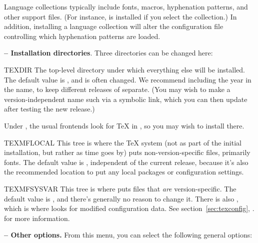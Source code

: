 \documentclass{article}
\begin{document}
\noindent Language collections typically include fonts, macros,
hyphenation patterns, and other support files.  (For instance,
 is installed if you select the 
collection.)  In addition, installing a language collection will alter
the  configuration file controlling which
hyphenation patterns are loaded.

\textbf{ -- Installation directories}.  Three directories can
be changed here:
\label{text:instdir}

\begin{ttdescription}
\item [TEXDIR] The top-level directory under which
everything else will be installed.  The default value is
, and is often changed.  We recommend
including the year in the name, to keep different releases of \TL{}
separate.  (You may wish to make a version-independent name such
 via a symbolic link, which you can then
update after testing the new release.)

Under \MacOSX, the usual frontends look for \TeX{} in
, so you may wish to install \TL{} there.

\item [TEXMFLOCAL] This tree is where the \TeX{} system (not as part of
the initial installation, but rather as time goes by) puts
non-version-specific files, primarily fonts.  The default value is
, independent of the current
\TL{} release, because it's also the recommended location to put any
local packages or configuration settings.

\item [TEXMFSYSVAR] This tree is where  puts
files that \emph{are} version-specific.  The default value is
, and there's generally no reason to change
it.  There is also , which is where
 looks for modified configuration data.  See
section~\ref{sec:texconfig}, \p.\pageref{sec:texconfig} for more
information.

\end{ttdescription}

\textbf{ -- Other options.}  From this menu, you can select
the following general options:
\end{document}
